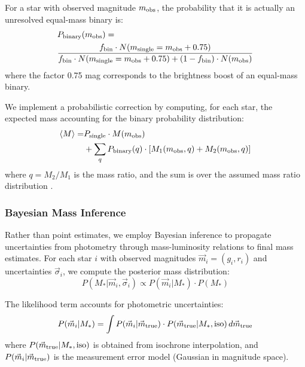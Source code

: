 \documentclass[linenumbers,trackchanges,twocolumn]{aastex701}
\begin{document}
For a star with observed magnitude $m_{\rm obs}$, the probability that it is actually an unresolved equal-mass binary is:
\begin{equation}
\begin{split}
&P_{\rm binary}(m_{\rm obs}) = \\
&\frac{f_{\rm bin} \cdot N(m_{\rm single} = m_{\rm obs} + 0.75)}{f_{\rm bin} \cdot N(m_{\rm single} = m_{\rm obs} + 0.75) + (1-f_{\rm bin}) \cdot N(m_{\rm obs})}
\end{split}
\end{equation}
where the factor 0.75 mag corresponds to the brightness boost of an equal-mass binary.

We implement a probabilistic correction by computing, for each star, the expected mass accounting for the binary probability distribution:
\begin{equation}
\begin{split}
\langle M \rangle =& P_{\rm single} \cdot M(m_{\rm obs})  \\
&+ \sum_q P_{\rm binary}(q) \cdot [M_1(m_{\rm obs}, q) + M_2(m_{\rm obs}, q)]
\end{split}
\end{equation}
where $q = M_2/M_1$ is the mass ratio, and the sum is over the assumed mass ratio distribution \citep{raghavan2010}.

\subsubsection{Bayesian Mass Inference}

Rather than point estimates, we employ Bayesian inference to propagate uncertainties from photometry through mass-luminosity relations to final mass estimates. For each star $i$ with observed magnitudes $\vec{m}_i = (g_i, r_i)$ and uncertainties $\vec{\sigma}_i$, we compute the posterior mass distribution:
\begin{equation}
P(M_* | \vec{m}_i, \vec{\sigma}_i) \propto P(\vec{m}_i | M_*) \cdot P(M_*)
\end{equation}

The likelihood term accounts for photometric uncertainties:
\begin{equation}
P(\vec{m}_i | M_*) = \int P(\vec{m}_i | \vec{m}_{\rm true}) \cdot P(\vec{m}_{\rm true} | M_*, {\rm iso}) \, d\vec{m}_{\rm true}
\end{equation}
where $P(\vec{m}_{\rm true} | M_*, {\rm iso})$ is obtained from isochrone interpolation, and $P(\vec{m}_i | \vec{m}_{\rm true})$ is the measurement error model (Gaussian in magnitude space).
\end{document}
